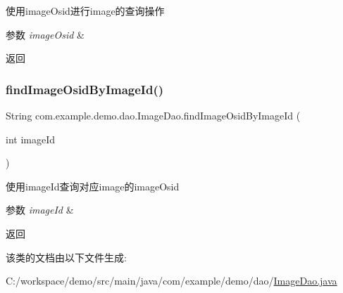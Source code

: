 使用image\+Osid进行image的查询操作 
\begin{DoxyParams}{参数}
{\em image\+Osid} & \\
\hline
\end{DoxyParams}
\begin{DoxyReturn}{返回}

\end{DoxyReturn}
\mbox{\label{interfacecom_1_1example_1_1demo_1_1dao_1_1_image_dao_a89a72db30ef78911c4cb22ff0d0dee98}} 
\subsubsection{\texorpdfstring{find\+Image\+Osid\+By\+Image\+Id()}{findImageOsidByImageId()}}
{\footnotesize\ttfamily String com.\+example.\+demo.\+dao.\+Image\+Dao.\+find\+Image\+Osid\+By\+Image\+Id (\begin{DoxyParamCaption}\item[{int}]{image\+Id }\end{DoxyParamCaption})}

使用image\+Id查询对应image的image\+Osid 
\begin{DoxyParams}{参数}
{\em image\+Id} & \\
\hline
\end{DoxyParams}
\begin{DoxyReturn}{返回}

\end{DoxyReturn}


该类的文档由以下文件生成\+:\begin{DoxyCompactItemize}
\item 
C\+:/workspace/demo/src/main/java/com/example/demo/dao/\mbox{\hyperlink{_image_dao_8java}{Image\+Dao.\+java}}\end{DoxyCompactItemize}
